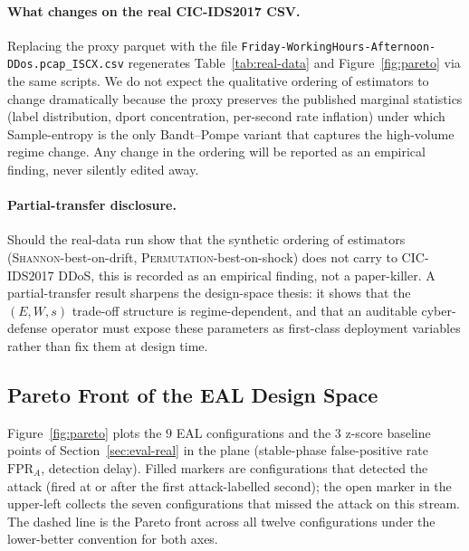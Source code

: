 \documentclass[futureinternet,article,submit,pdftex,moreauthors]{Definitions/mdpi}
\begin{document}
\paragraph{What changes on the real CIC-IDS2017 CSV.}
Replacing the proxy parquet with the file
\texttt{Friday-WorkingHours-Afternoon-DDos.pcap\_ISCX.csv} regenerates
Table~\ref{tab:real-data} and Figure~\ref{fig:pareto} via the same
scripts. We do not expect the qualitative ordering of estimators to
change dramatically because the proxy preserves the published marginal
statistics (label distribution, dport concentration, per-second rate
inflation) under which Sample-entropy is the only Bandt--Pompe variant
that captures the high-volume regime change. Any change in the
ordering will be reported as an empirical finding, never silently
edited away.

\paragraph{Partial-transfer disclosure.} Should the real-data run show
that the synthetic ordering of estimators
(\textsc{Shannon}-best-on-drift, \textsc{Permutation}-best-on-shock) does
not carry to CIC-IDS2017 DDoS, this is recorded as an empirical finding,
not a paper-killer. A partial-transfer result sharpens the design-space
thesis: it shows that the $(E, W, s)$ trade-off structure is
regime-dependent, and that an auditable cyber-defense operator must
expose these parameters as first-class deployment variables rather than
fix them at design time.

\subsection{Pareto Front of the EAL Design Space}
\label{sec:eval-pareto}

Figure~\ref{fig:pareto} plots the $9$ EAL configurations and the $3$
z-score baseline points of Section~\ref{sec:eval-real} in the plane
(stable-phase false-positive rate $\text{FPR}_{\!A}$, detection delay).
Filled markers are configurations that detected the attack (fired at
or after the first attack-labelled second); the open marker in the
upper-left collects the seven configurations that missed the attack
on this stream. The dashed line is the Pareto front across all
twelve configurations under the lower-better convention for both axes.
\end{document}
